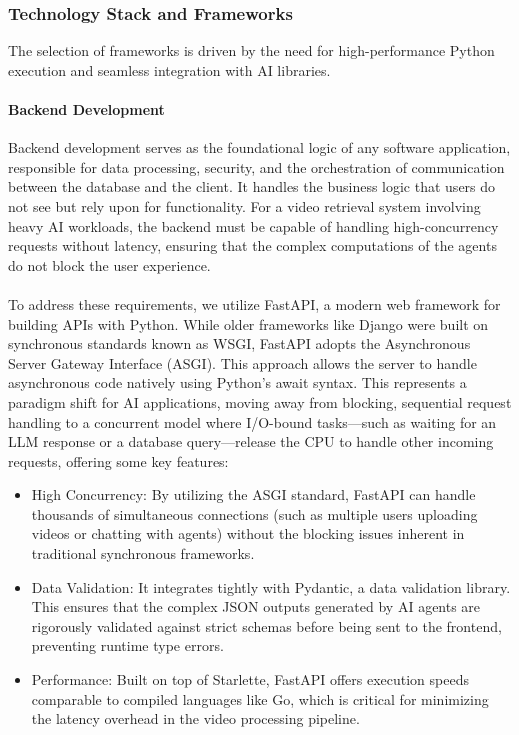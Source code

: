 \subsubsection{Technology Stack and Frameworks}
The selection of frameworks is driven by the need for high-performance Python execution and seamless integration with AI libraries.

\paragraph*{Backend Development}
Backend development serves as the foundational logic of any software application, responsible for data processing, security, and the orchestration of communication between the database and the client. It handles the business logic that users do not see but rely upon for functionality. For a video retrieval system involving heavy AI workloads, the backend must be capable of handling high-concurrency requests without latency, ensuring that the complex computations of the agents do not block the user experience.
\\\\To address these requirements, we utilize FastAPI, a modern web framework for building APIs with Python. While older frameworks like Django were built on synchronous standards known as WSGI, FastAPI adopts the Asynchronous Server Gateway Interface (ASGI). This approach allows the server to handle asynchronous code natively using Python's await syntax. This represents a paradigm shift for AI applications, moving away from blocking, sequential request handling to a concurrent model where I/O-bound tasks—such as waiting for an LLM response or a database query—release the CPU to handle other incoming requests, offering some key features:
\begin{itemize}
    \item High Concurrency: By utilizing the ASGI standard, FastAPI can handle thousands of simultaneous connections (such as multiple users uploading videos or chatting with agents) without the blocking issues inherent in traditional synchronous frameworks.
    \item Data Validation: It integrates tightly with Pydantic, a data validation library. This ensures that the complex JSON outputs generated by AI agents are rigorously validated against strict schemas before being sent to the frontend, preventing runtime type errors.
    \item Performance: Built on top of Starlette, FastAPI offers execution speeds comparable to compiled languages like Go, which is critical for minimizing the latency overhead in the video processing pipeline.
\end{itemize}

